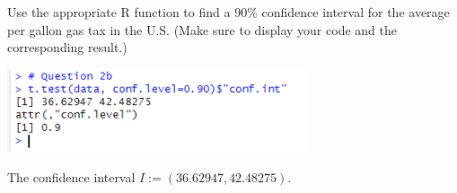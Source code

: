 Use the appropriate R function to find a 90\% confidence interval for the average per gallon gas tax in
the U.S. (Make sure to display your code and the corresponding result.)

\noindent \includegraphics[width=3.5in]{r_2b.PNG}

\noindent The confidence interval $I := (36.62947, 42.48275)$.